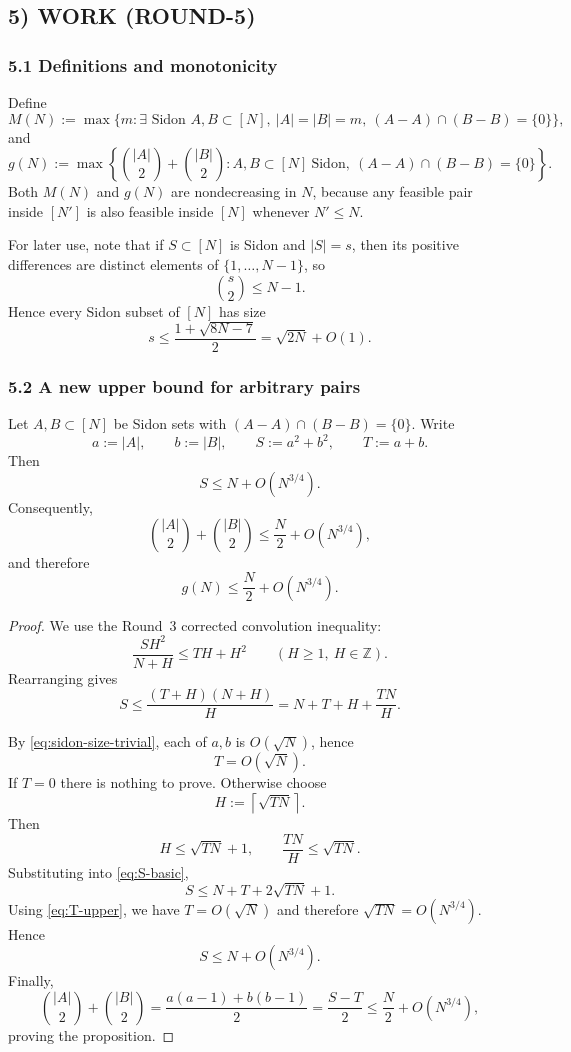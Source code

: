 \subsection{5) WORK (ROUND-5)}

\subsubsection{5.1 Definitions and monotonicity}

Define
\[
M(N):=\max\bigl\{m:\exists\text{ Sidon }A,B\subset[N],\ |A|=|B|=m,\ (A-A)\cap(B-B)=\{0\}\bigr\},
\]
and
\[
g(N):=\max\left\{\binom{|A|}{2}+\binom{|B|}{2}: A,B\subset[N]\ \text{Sidon},\ (A-A)\cap(B-B)=\{0\}\right\}.
\]
Both $M(N)$ and $g(N)$ are nondecreasing in $N$, because any feasible pair inside $[N']$ is also feasible inside $[N]$ whenever $N'\le N$.

For later use, note that if $S\subset[N]$ is Sidon and $|S|=s$, then its positive differences are distinct elements of $\{1,\dots,N-1\}$, so
\[
\binom{s}{2}\le N-1.
\]
Hence every Sidon subset of $[N]$ has size
\begin{equation}\label{eq:sidon-size-trivial}
s\le \frac{1+\sqrt{8N-7}}{2}=\sqrt{2N}+O(1).
\end{equation}

\subsubsection{5.2 A new upper bound for arbitrary pairs}

\begin{proposition}\label{prop:g-upper}
Let $A,B\subset[N]$ be Sidon sets with $(A-A)\cap(B-B)=\{0\}$.  Write
\[
a:=|A|,\qquad b:=|B|,\qquad S:=a^2+b^2,\qquad T:=a+b.
\]
Then
\[
S\le N+O(N^{3/4}).
\]
Consequently,
\[
\binom{|A|}{2}+\binom{|B|}{2}\le \frac N2+O(N^{3/4}),
\]
and therefore
\[
g(N)\le \frac N2+O(N^{3/4}).
\]
\end{proposition}

\begin{proof}
We use the Round~3 corrected convolution inequality:
\[
\frac{SH^2}{N+H}\le TH+H^2
\qquad (H\ge 1,\ H\in\mathbb Z).
\]
Rearranging gives
\begin{equation}\label{eq:S-basic}
S\le \frac{(T+H)(N+H)}{H}=N+T+H+\frac{TN}{H}.
\end{equation}

By \eqref{eq:sidon-size-trivial}, each of $a,b$ is $O(\sqrt N)$, hence
\begin{equation}\label{eq:T-upper}
T=O(\sqrt N).
\end{equation}
If $T=0$ there is nothing to prove.  Otherwise choose
\[
H:=\left\lceil\sqrt{TN}\right\rceil.
\]
Then
\[
H\le \sqrt{TN}+1,
\qquad
\frac{TN}{H}\le \sqrt{TN}.
\]
Substituting into \eqref{eq:S-basic},
\[
S\le N+T+2\sqrt{TN}+1.
\]
Using \eqref{eq:T-upper}, we have $T=O(\sqrt N)$ and therefore $\sqrt{TN}=O(N^{3/4})$.  Hence
\[
S\le N+O(N^{3/4}).
\]
Finally,
\[
\binom{|A|}{2}+\binom{|B|}{2}
=\frac{a(a-1)+b(b-1)}{2}
=\frac{S-T}{2}
\le \frac N2+O(N^{3/4}),
\]
proving the proposition.
\end{proof}

